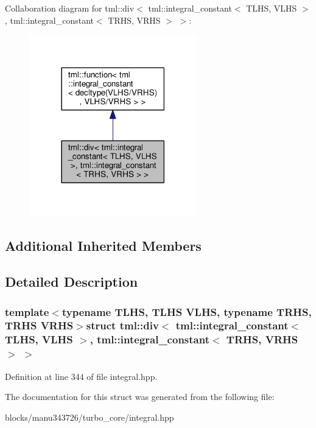 Collaboration diagram for tml\+:\+:div$<$ tml\+:\+:integral\+\_\+constant$<$ T\+L\+H\+S, V\+L\+H\+S $>$, tml\+:\+:integral\+\_\+constant$<$ T\+R\+H\+S, V\+R\+H\+S $>$ $>$\+:
\nopagebreak
\begin{figure}[H]
\begin{center}
\leavevmode
\includegraphics[width=206pt]{structtml_1_1div_3_01tml_1_1integral__constant_3_01_t_l_h_s_00_01_v_l_h_s_01_4_00_01tml_1_1integcb9a7cc4f59d06b3cbb321d68910c998}
\end{center}
\end{figure}
\subsection*{Additional Inherited Members}


\subsection{Detailed Description}
\subsubsection*{template$<$typename T\+L\+H\+S, T\+L\+H\+S V\+L\+H\+S, typename T\+R\+H\+S, T\+R\+H\+S V\+R\+H\+S$>$struct tml\+::div$<$ tml\+::integral\+\_\+constant$<$ T\+L\+H\+S, V\+L\+H\+S $>$, tml\+::integral\+\_\+constant$<$ T\+R\+H\+S, V\+R\+H\+S $>$ $>$}



Definition at line 344 of file integral.\+hpp.



The documentation for this struct was generated from the following file\+:\begin{DoxyCompactItemize}
\item 
blocks/manu343726/turbo\+\_\+core/integral.\+hpp\end{DoxyCompactItemize}
